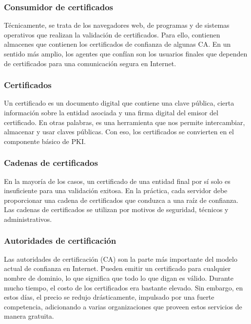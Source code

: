 \subsubsection*{Consumidor de certificados}

Técnicamente, se trata de los navegadores web, de programas y de sistemas 
operativos que realizan la validación de certificados. Para ello, contienen 
almacenes que contienen los certificados de confianza de algunas CA. En un 
sentido más amplio, los agentes que confían son los usuarios finales que 
dependen de certificados para una comunicación segura en Internet.

\subsubsection*{Certificados}

Un certificado es un documento digital que contiene una clave pública, cierta 
información sobre la entidad asociada y una firma digital del emisor del 
certificado. En otras palabras, es una herramienta que nos permite intercambiar, 
almacenar y usar claves públicas. Con eso, los certificados se convierten en 
el componente básico de PKI.

\subsubsection*{Cadenas de certificados}

En la mayoría de los casos, un certificado de una entidad final por sí solo es 
insuficiente para una validación exitosa. En la práctica, cada servidor debe 
proporcionar una cadena de certificados que conduzca a una raíz de confianza. 
Las cadenas de certificados se utilizan por motivos de seguridad, técnicos y 
administrativos.

\subsubsection*{Autoridades de certificación}

Las autoridades de certificación (CA) son la parte más importante del modelo 
actual de confianza en Internet. Pueden emitir un certificado para cualquier 
nombre de dominio, lo que significa que todo lo que digan es válido. 
Durante mucho tiempo, el costo de los certificados era bastante elevado. 
Sin embargo, en estos días, el precio se redujo drásticamente, impulsado 
por una fuerte competencia, adicionando a varias organizaciones que proveen 
estos servicios de manera gratuita. 

